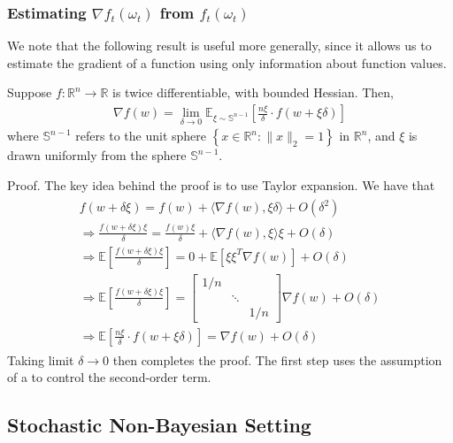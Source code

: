 \documentclass{article}
\begin{document}
\subsubsection{Estimating $\nabla f_{t}\left(\omega_{t}\right)$ from $f_{t}\left(\omega_{t}\right)$}
We note that the following result is useful more generally, since it allows us to estimate the gradient of a function using only information about function values.
\begin{lema}
  Suppose $f: \mathbb{R}^{n} \rightarrow \mathbb{R}$ is twice differentiable, with bounded Hessian. Then,
\begin{align*}
\nabla f(w)=\lim _{\delta \rightarrow 0} \mathbb{E}_{\xi \sim \mathbb{S}^{n-1}}\left[\frac{n\xi}{\delta} \cdot f(w+\xi \delta)\right]
\end{align*}
where $\mathbb{S}^{n-1}$ refers to the unit sphere $\left\{x \in \mathbb{R}^{n}:\|x\|_{2}=1\right\}$ in $\mathbb{R}^{n}$, and $\xi$ is drawn uniformly from the sphere $\mathbb{S}^{n-1}$.
\end{lema} 
Proof. The key idea behind the proof is to use Taylor expansion. We have that
\begin{align*}
\begin{gathered}
f(w+\delta \xi)=f(w)+\langle\nabla f(w), \xi \delta\rangle+O\left(\delta^{2}\right) \\
\Longrightarrow \frac{f(w+\delta \xi) \xi}{\delta}=\frac{f(w) \xi}{\delta}+\langle\nabla f(w), \xi\rangle \xi+O(\delta) \\
\Longrightarrow \mathbb{E}\left[\frac{f(w+\delta \xi) \xi}{\delta}\right]=0+\mathbb{E}\left[\xi \xi^{T} \nabla f(w)\right]+O(\delta) \\
\Longrightarrow \mathbb{E}\left[\frac{f(w+\delta \xi) \xi}{\delta}\right]=\left[\begin{array}{ccc}
1 / n & & \\
& \ddots & \\
& & 1 / n
\end{array}\right] \nabla f(w)+O(\delta) \\
\Longrightarrow \mathbb{E}\left[\frac{n \xi}{\delta} \cdot f(w+\xi \delta)\right]=\nabla f(w)+O(\delta)
\end{gathered}
\end{align*}
Taking limit $\delta \rightarrow 0$ then completes the proof. The first step uses the assumption of a  to control the second-order term. 
\subsection{Stochastic Non-Bayesian Setting}
\end{document}
